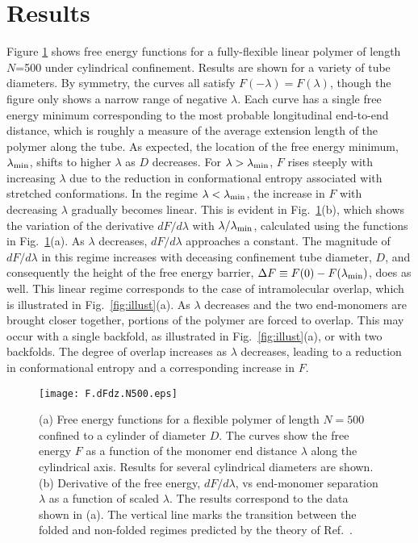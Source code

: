 \documentclass[journal=mamobx,manuscript=article,layout=twocolumn]{achemso}
\begin{document}
\section{Results}
\label{sec:results}

Figure \ref{fig:F.dFdz.N500} shows free energy functions for a fully-flexible linear
polymer of length $N$=500 under cylindrical confinement. Results are shown for a 
variety of tube diameters. By symmetry, the curves all satisfy $F(-\lambda)=F(\lambda)$,
though the figure only shows a narrow range of negative $\lambda$.  Each curve has a single
free energy minimum corresponding to the most probable longitudinal end-to-end distance,
which is roughly a measure of the average extension length of the polymer along
the tube. As expected, the location of the free energy minimum, $\lambda_{\rm min}$,
shifts to higher $\lambda$ as $D$ decreases. For $\lambda > \lambda_{\rm min}$, $F$
rises steeply with increasing $\lambda$ due to the reduction in conformational entropy 
associated with stretched conformations. In the regime $\lambda < \lambda_{\rm min}$,
the increase in $F$ with decreasing $\lambda$ gradually becomes linear. This is
evident in Fig.~\ref{fig:F.dFdz.N500}(b), which shows the variation of the derivative 
$dF/d\lambda$ with $\lambda/\lambda_{\rm min}$, calculated using the functions in 
Fig.~\ref{fig:F.dFdz.N500}(a). As $\lambda$ decreases, $dF/d\lambda$ approaches a constant.
The magnitude of $dF/d\lambda$ in this regime increases with deceasing confinement tube 
diameter, $D$, and consequently the height of the free energy barrier,
$\Delta F\equiv F(0)-F(\lambda_{\rm min})$, does as well.
This linear regime corresponds to the case of intramolecular overlap, which is illustrated
in Fig.~\ref{fig:illust}(a). As $\lambda$ decreases and the two end-monomers are brought
closer together, portions of the polymer are forced to overlap. This may occur with a
single backfold, as illustrated in Fig.~\ref{fig:illust}(a), or with two backfolds.
The degree of overlap increases as $\lambda$ decreases, leading to a reduction in
conformational entropy and a corresponding increase in $F$.

\begin{figure}[!ht]
\begin{center}
\texttt{[image: F.dFdz.N500.eps]}
\end{center}
\caption{
(a) Free energy functions for a flexible polymer of length $N=500$ confined to a cylinder 
of diameter $D$. The curves show the free energy $F$ as a function of the monomer end 
distance $\lambda$ along the cylindrical axis.  Results for several cylindrical diameters 
are shown. 
(b) Derivative of the free energy, $dF/d\lambda$, vs end-monomer separation $\lambda$
as a function of scaled $\lambda$. The results correspond to the data shown in (a). The 
vertical line marks the transition between the folded and non-folded regimes predicted by
the theory of Ref.~.  }
\label{fig:F.dFdz.N500}
\end{figure}
\end{document}
